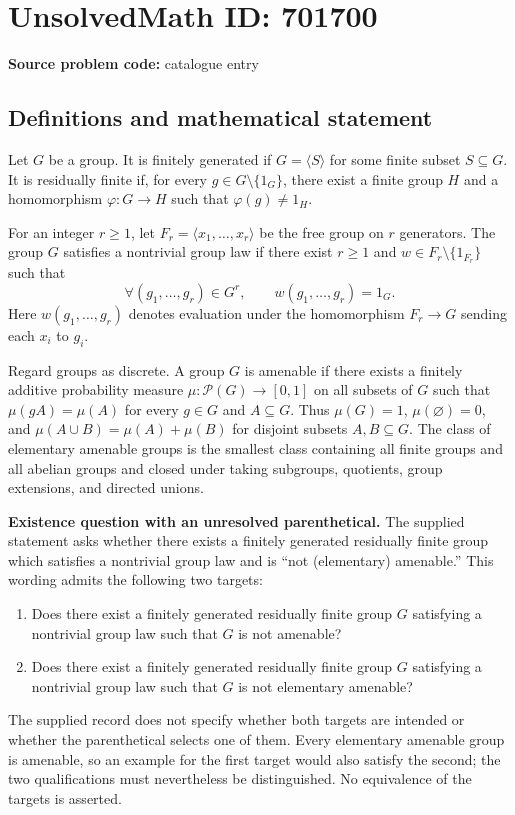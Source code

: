 \documentclass[11pt]{article}
\begin{document}
\section*{UnsolvedMath ID: 701700}
\textbf{Source problem code:} catalogue entry
\subsection{Definitions and mathematical statement}
Let \(G\) be a group. It is finitely generated if \(G=\langle S\rangle\) for some finite subset \(S\subseteq G\). It is residually finite if, for every \(g\in G\setminus\{1_G\}\), there exist a finite group \(H\) and a homomorphism \(\varphi:G\to H\) such that \(\varphi(g)\ne 1_H\).

For an integer \(r\ge 1\), let \(F_r=\langle x_1,\ldots,x_r\rangle\) be the free group on \(r\) generators. The group \(G\) satisfies a nontrivial group law if there exist \(r\ge 1\) and \(w\in F_r\setminus\{1_{F_r}\}\) such that
\[
\forall (g_1,\ldots,g_r)\in G^r,\qquad w(g_1,\ldots,g_r)=1_G.
\]
Here \(w(g_1,\ldots,g_r)\) denotes evaluation under the homomorphism \(F_r\to G\) sending each \(x_i\) to \(g_i\).

Regard groups as discrete. A group \(G\) is amenable if there exists a finitely additive probability measure \(\mu:\mathcal P(G)\to[0,1]\) on all subsets of \(G\) such that \(\mu(gA)=\mu(A)\) for every \(g\in G\) and \(A\subseteq G\). Thus \(\mu(G)=1\), \(\mu(\varnothing)=0\), and \(\mu(A\cup B)=\mu(A)+\mu(B)\) for disjoint subsets \(A,B\subseteq G\). The class of elementary amenable groups is the smallest class containing all finite groups and all abelian groups and closed under taking subgroups, quotients, group extensions, and directed unions.

\textbf{Existence question with an unresolved parenthetical.} The supplied statement asks whether there exists a finitely generated residually finite group which satisfies a nontrivial group law and is ``not (elementary) amenable.'' This wording admits the following two targets:
\begin{enumerate}
\item Does there exist a finitely generated residually finite group \(G\) satisfying a nontrivial group law such that \(G\) is not amenable?
\item Does there exist a finitely generated residually finite group \(G\) satisfying a nontrivial group law such that \(G\) is not elementary amenable?
\end{enumerate}
The supplied record does not specify whether both targets are intended or whether the parenthetical selects one of them. Every elementary amenable group is amenable, so an example for the first target would also satisfy the second; the two qualifications must nevertheless be distinguished. No equivalence of the targets is asserted.
\end{document}

